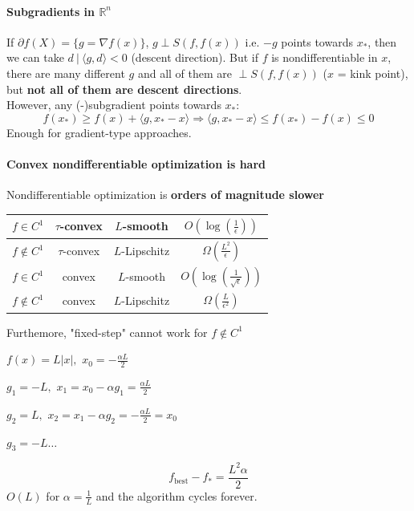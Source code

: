 \documentclass[10pt]{report}
\begin{document}
\paragraph{Subgradients in $\mathbb{R}^n$} If $\partial f(X) = \{g=\nabla f(x)\}$, $g\perp S(f,f(x))$ i.e. $-g$ points towards $x_*$, then we can take $d\:|\:\langle g,d\rangle < 0$ (descent direction). But if $f$ is nondifferentiable in $x$, there are many different $g$ and all of them are $\perp S(f,f(x))$ ($x$ = kink point), but \textbf{not all of them are descent directions}.\\
However, any (-)subgradient points towards $x_*$:
$$f(x_*)\geq f(x)+\langle g,x_*-x\rangle\Rightarrow \langle g,x_*-x\rangle\leq f(x_*)-f(x)\leq 0$$
Enough for gradient-type approaches.
\paragraph{Convex nondifferentiable optimization is hard} Nondifferentiable optimization is \textbf{orders of magnitude slower}
\begin{center}
	\begin{tabular}{c | c | c | c}
	$f\in C^1$&$\tau$-convex&$L$-smooth&$O\left(\log\left(\frac{1}{\epsilon}\right)\right)$\\
	\hline
	$f\not\in C^1$&$\tau$-convex&$L$-Lipschitz&$\Omega\left(\frac{L^2}{\epsilon}\right)$\\
	\hline
	$f\in C^1$&convex&$L$-smooth&$O\left(\log\left(\frac{1}{\sqrt{\epsilon}}\right)\right)$\\
	\hline
	$f\not\in C^1$&convex&$L$-Lipschitz&$\Omega\left(\frac{L}{\epsilon^2}\right)$
	\end{tabular}
\end{center}
Furthemore, "fixed-step" cannot work for $f\not\in C^1$
\begin{list}{}{}
	\item $f(x) = L|x|,$ $x_0 =-\frac{\alpha L}{2}$
	\item $g_1 = -L,$ $x_1 = x_0 - \alpha g_1 = \frac{\alpha L}{2}$
	\item $g_2 = L,$ $x_2 = x_1 - \alpha g_2 = -\frac{\alpha L}{2} = x_0$
	\item $g_3 = -L\ldots$
\end{list}
$$f_{\text{best}} - f_* = \frac{L^2\alpha}{2}$$
$O(L)$ for $\alpha=\frac{1}{L}$ and the algorithm cycles forever.
\pagebreak
\end{document}
